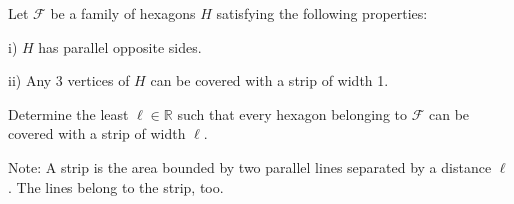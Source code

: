 Let $ \mathcal{F}$ be a family of hexagons $ H$ satisfying the following properties:

i) $ H$ has parallel opposite sides.

ii) Any 3 vertices of $ H$ can be covered with a strip of width 1.

Determine the least $ \ell\in\mathbb{R}$ such that every hexagon belonging to $ \mathcal{F}$ can be covered with a strip of width $ \ell$.

Note: A strip is the area bounded by two parallel lines separated by a distance $ \ell$. The lines belong to the strip, too.